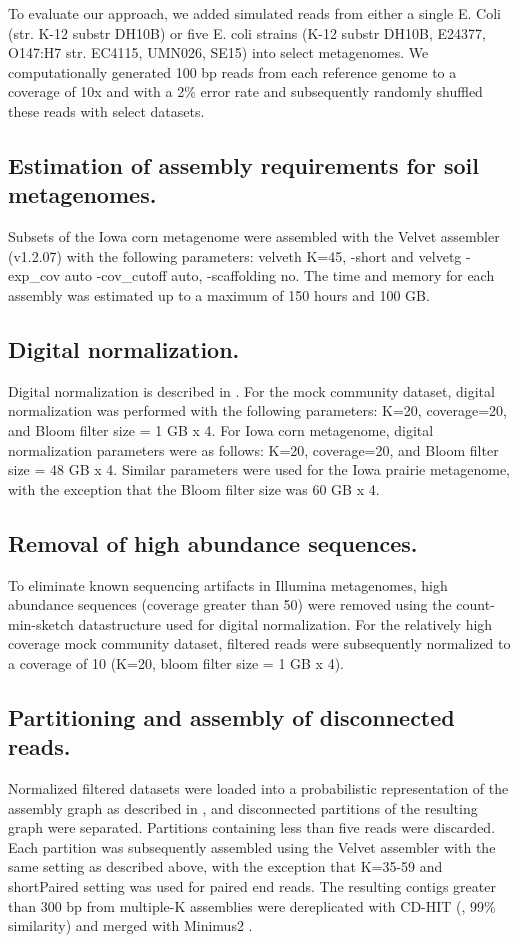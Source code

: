 \documentclass{pnastwo}
\begin{document}
\begin{article}
To evaluate our approach, we added simulated reads from either a
single E. Coli (str. K-12 substr DH10B) or five E. coli strains (K-12
substr DH10B, E24377, O147:H7 str. EC4115, UMN026, SE15) into select
metagenomes.  We computationally generated 100 bp reads from each
reference genome to a coverage of 10x and with a 2\% error rate and
subsequently randomly shuffled these reads with select datasets.

\subsection*{Estimation of assembly requirements for soil metagenomes.}
Subsets of the Iowa corn metagenome were assembled with the Velvet
assembler (v1.2.07) with the following parameters: velveth K=45,
-short and velvetg -exp\_cov auto -cov\_cutoff auto, -scaffolding no.
The time and memory for each assembly was estimated up to a maximum of
150 hours and 100 GB.

\subsection*{Digital normalization.}
Digital normalization is described in \cite{browndiginorm}.  
For the mock
community dataset, digital normalization was performed with the
following parameters: K=20, coverage=20, and Bloom filter size = 1 GB
x 4.  For Iowa corn metagenome, digital normalization parameters were
as follows: K=20, coverage=20, and Bloom filter size = 48 GB x 4.
Similar parameters were used for the Iowa prairie metagenome, with the
exception that the Bloom filter size was 60 GB x 4.

\subsection*{Removal of high abundance sequences.}
To eliminate known sequencing artifacts in Illumina metagenomes, high abundance 
sequences (coverage
greater than 50) were removed using the count-min-sketch datastructure
used for digital normalization.  For the relatively high coverage mock
community dataset, filtered reads were subsequently normalized to a
coverage of 10 (K=20, bloom filter size = 1 GB x 4).

\subsection*{Partitioning and assembly of disconnected reads.}
Normalized filtered datasets were loaded into a probabilistic
representation of the assembly graph as described in \cite{Pell:2012cq}, and
disconnected partitions of the resulting graph were separated.
Partitions containing less than five reads were discarded.  Each
partition was subsequently assembled using the Velvet assembler with
the same setting as described above, with the exception that K=35-59
and shortPaired setting was used for paired end reads.  The resulting
contigs greater than 300 bp from multiple-K assemblies were
dereplicated with CD-HIT (\cite{Fu:2012jk}, 99\% similarity) and merged with
Minimus2 \cite{Sommer:2007p1253}.



\end{article}
\end{document}
